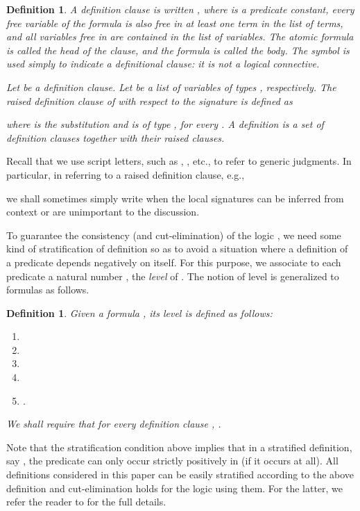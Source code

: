\documentclass{acmtrans2m}
\newenvironment{definition}{\begin{define} \rm}{\end{define}}
\newtheorem{define}[theorem]{Definition}
\begin{document}
\begin{definition}
\label{def:def}
A {\em definition clause} is written 
, 
where  is a predicate constant, every free variable of
the formula  is also free in at least one term in the list
 of terms, and all variables free in  are
contained in the list  of variables.  The atomic formula  is called the {\em head} of the clause, and the formula
 is called the {\em body}.  The symbol  is used simply to
indicate a definitional clause: it is not a logical connective.  

Let  be a
definition clause. Let  be a list of variables of types
, respectively. 
The {\em raised definition clause} of  with respect to the signature
 is defined as

where  is the substitution
 and 
 is of type
, for every
. 
A {\em definition} is a set of definition clauses
together with their raised clauses.
\end{definition}

Recall that we use script letters, such as , , etc., 
to refer to generic judgments. In particular, in referring to a raised definition clause, e.g., 

we shall sometimes simply write  when the 
local signatures can be inferred from context or are unimportant to the discussion.

To guarantee the consistency (and cut-elimination) of the logic
, we need some kind of stratification of definition so as to 
avoid a situation where a definition of a predicate depends
negatively on itself. 
For this purpose, we associate to each predicate  a 
natural number , the {\em level} of .  The notion of
level is generalized to formulas as follows.
\begin{definition}
\label{def:level}
Given a formula , its {\em level}  is defined as follows:
\begin{enumerate}
\item 
\item 
\item 
\item 
\item . 
\end{enumerate}
We shall require that for every definition clause , .  
\end{definition}
Note that the stratification condition above implies that in
a stratified definition, say ,
the predicate  can only occur strictly positively in  (if it occurs at all).
All definitions considered in this paper can be easily stratified according
to the above definition and cut-elimination holds for the logic using them.
For the latter, we refer the reader to \cite{miller05tocl} for the full details.
\end{document}
